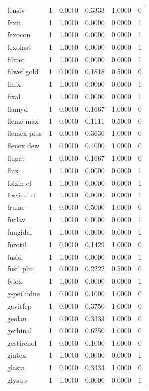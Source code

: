 \begin{longtable}{p{3.0cm}rrrrr}
fensiv & 1 & 0.0000 & 0.3333 & 1.0000 & 0 \\
fexit & 1 & 1.0000 & 0.0000 & 0.0000 & 1 \\
fexocon & 1 & 1.0000 & 0.0000 & 0.0000 & 1 \\
fexofast & 1 & 1.0000 & 0.0000 & 0.0000 & 1 \\
filmet & 1 & 1.0000 & 0.0000 & 0.0000 & 1 \\
filwef gold & 1 & 0.0000 & 0.1818 & 0.5000 & 0 \\
finix & 1 & 1.0000 & 0.0000 & 0.0000 & 1 \\
fixal & 1 & 1.0000 & 0.0000 & 0.0000 & 1 \\
flamyd & 1 & 0.0000 & 0.1667 & 1.0000 & 0 \\
fleme max & 1 & 0.0000 & 0.1111 & 0.5000 & 0 \\
flemex plus & 1 & 0.0000 & 0.3636 & 1.0000 & 0 \\
flenex dew & 1 & 0.0000 & 0.4000 & 1.0000 & 0 \\
flugat & 1 & 0.0000 & 0.1667 & 1.0000 & 0 \\
flux & 1 & 1.0000 & 0.0000 & 0.0000 & 1 \\
folzin-cl & 1 & 1.0000 & 0.0000 & 0.0000 & 1 \\
fossical d & 1 & 1.0000 & 0.0000 & 0.0000 & 1 \\
frulac & 1 & 0.0000 & 0.5000 & 1.0000 & 0 \\
fuclav & 1 & 1.0000 & 0.0000 & 0.0000 & 1 \\
fungidal & 1 & 1.0000 & 0.0000 & 0.0000 & 1 \\
furotil & 1 & 0.0000 & 0.1429 & 1.0000 & 0 \\
fusid & 1 & 1.0000 & 0.0000 & 0.0000 & 1 \\
fusil plm & 1 & 0.0000 & 0.2222 & 0.5000 & 0 \\
fylox & 1 & 1.0000 & 0.0000 & 0.0000 & 1 \\
g-pethidne & 1 & 0.0000 & 0.1000 & 1.0000 & 0 \\
gavitfep & 1 & 0.0000 & 0.3750 & 1.0000 & 0 \\
geolan & 1 & 0.0000 & 0.3333 & 1.0000 & 0 \\
gerhinal & 1 & 0.0000 & 0.6250 & 1.0000 & 0 \\
gestirenol & 1 & 0.0000 & 0.1000 & 1.0000 & 0 \\
gintex & 1 & 1.0000 & 0.0000 & 0.0000 & 1 \\
glasin & 1 & 0.0000 & 0.3333 & 1.0000 & 0 \\
glysup & 1 & 1.0000 & 0.0000 & 0.0000 & 1 \\

\end{longtable}

